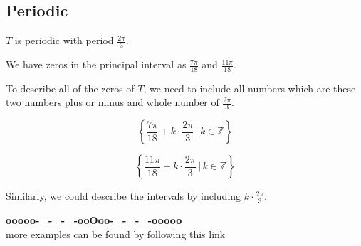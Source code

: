 \documentclass{ximera}
\begin{document}
\subsection*{Periodic}

$T$ is periodic with period $\frac{2\pi}{3}$. 



We have zeros in the principal interval as $\frac{7\pi}{18}$ and $\frac{11\pi}{18}$. 


To describe all of the zeros of $T$, we need to include all numbers which are these two numbers plus or minus and whole number of $\frac{2\pi}{3}$. 



\[
\left\{  \frac{7\pi}{18} + k  \cdot \frac{2\pi}{3}  \, | \,  k \in \mathbb{Z}         \right\}
\]



\[
\left\{  \frac{11\pi}{18} + k  \cdot \frac{2\pi}{3}  \, | \,  k \in \mathbb{Z}         \right\}
\]




Similarly, we could describe the intervals by including $k  \cdot \frac{2\pi}{3} $. 














\begin{center}
\textbf{\textcolor{green!50!black}{ooooo-=-=-=-ooOoo-=-=-=-ooooo}} \\

more examples can be found by following this link\\ 

\end{center}
\end{document}
